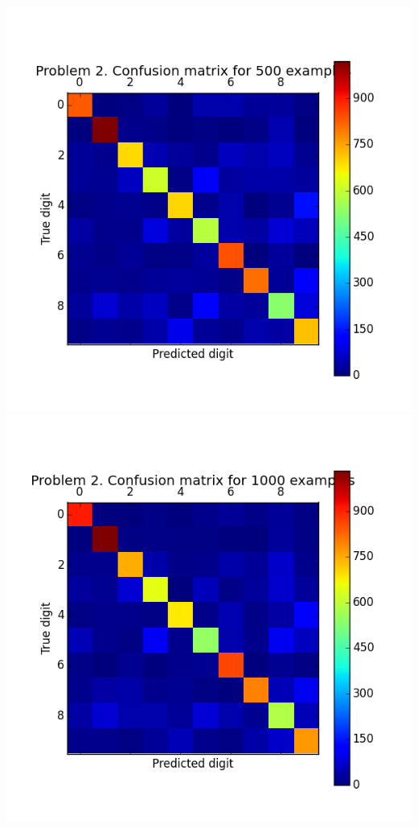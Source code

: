 \documentclass[11pt]{article}
\begin{document}
\includegraphics[scale=0.6]{figure4}
\includegraphics[scale=0.6]{figure5}
\end{document}
